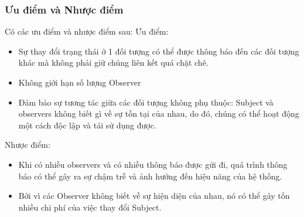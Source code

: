\subsubsection{Ưu điểm và Nhược điểm}
Có các ưu điểm và nhược điểm sau:
Ưu điểm:
\begin{itemize}
    \item Sự thay đổi trạng thái ở 1 đối tượng có thể được thông báo đến các đối tượng khác mà không phải giữ chúng liên kết quá chặt chẽ.
    \item Không giới hạn số lượng Observer
    \item Đảm bảo sự tương tác giữa các đối tượng không phụ thuộc: Subject và observers không biết gì về sự tồn tại của nhau, do đó, chúng có thể hoạt động một cách độc lập và tái sử dụng được.
\end{itemize}
Nhược điểm:
\begin{itemize}
    \item Khi có nhiều observers và có nhiều thông báo được gửi đi, quá trình thông báo có thể gây ra sự chậm trễ và ảnh hưởng đến hiệu năng của hệ thống.
    \item Bởi vì các Observer không biết về sự hiện diện của nhau, nó có thể gây tốn nhiều chi phí của việc thay đổi Subject.
\end{itemize}
